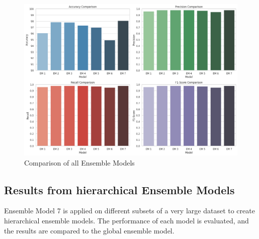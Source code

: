 \begin{figure}[h!]  
    \centering
    \includegraphics[width=1.0\textwidth]{Images/EM COMPARE.png}  
    \caption*{Comparison of all Ensemble Models}
    \label{lstm arch}  %
\end{figure}



\subsection{Results from hierarchical Ensemble Models}

\noindent
Ensemble Model 7 is applied on different subsets of a very large dataset to create hierarchical ensemble models. The performance of each model is evaluated, and the results are compared to the global ensemble model. 


